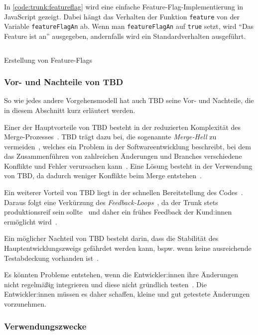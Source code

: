 In \autoref{code:trunk:featureflag} wird eine  einfache Feature\hyp Flag\hyp Implementierung in JavaScript gezeigt. Dabei hängt das Verhalten der Funktion \texttt{feature} von der Variable \texttt{featureFlagAn} ab. Wenn man \texttt{featureFlagAn} auf \texttt{true} setzt, wird \enquote{Das Feature ist an} ausgegeben, andernfalls wird ein Standardverhalten ausgeführt.

\begin{listing}
    \inputminted[breaklines]{js}{assets/code/trunk/featureflags.js}
    \caption{Erstellung von Feature\hyp Flags}
    \label{code:trunk:featureflag}
\end{listing}  


\subsubsection{Vor- und Nachteile von TBD}

So wie jedes andere Vorgehensmodell hat auch TBD seine Vor- und Nachteile, die in diesem Abschnitt kurz erläutert werden.

Einer der Hauptvorteile von TBD besteht in der reduzierten Komplexität des Merge\hyp Prozesses~\cite{trunkbased2}. TBD trägt dazu bei, die sogenannte \emph{Merge\hyp Hell} zu vermeiden~\cite{trunkbased2}, welches ein Problem in der Softwareentwicklung beschreibt, bei dem das Zusammenführen von zahlreichen Änderungen und Branches verschiedene Konflikte und Fehler verursachen kann~\cite{trunkbased8}. Eine Lösung besteht in der Verwendung von TBD, da dadurch weniger Konflikte beim Merge entstehen~\cite{trunkbased1}.

Ein weiterer Vorteil von TBD liegt in der schnellen Bereitstellung des Codes~\cite{trunkbased8}. Daraus folgt eine Verkürzung des \emph{Feedback\hyp Loops}~\cite{trunkbased2}, da der Trunk stets produktionsreif sein sollte~\cite{trunkbased1} und daher ein frühes Feedback der Kund:innen ermöglicht wird~\cite{trunkbased2}.

Ein möglicher Nachteil von TBD besteht darin, dass die Stabilität des Hauptentwicklungszweigs gefährdet werden kann, bspw. wenn keine ausreichende Testabdeckung vorhanden ist~\cite{trunkbased1}.

Es könnten Probleme entstehen, wenn die Entwickler:innen ihre Änderungen nicht regelmäßig integrieren und diese nicht gründlich testen~\cite{trunkbased1}. 
Die Entwickler:innen müssen es daher schaffen, kleine und gut getestete Änderungen vorzunehmen.


\subsubsection{Verwendungszwecke}

